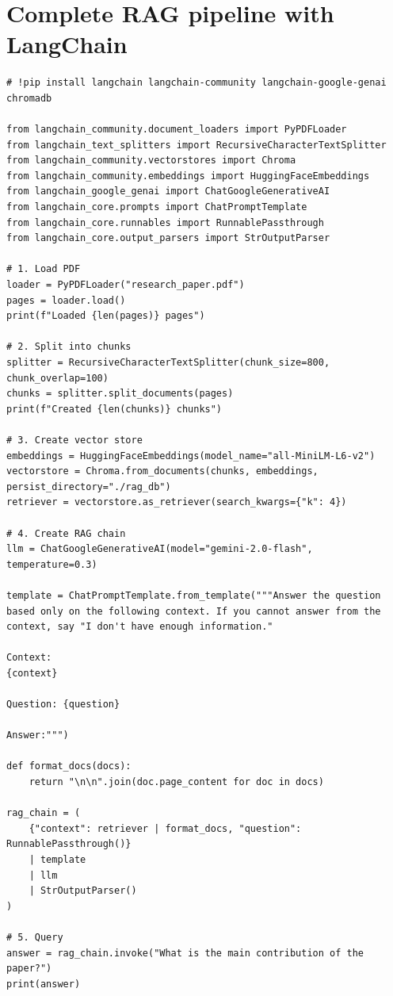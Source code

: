\section{Complete RAG pipeline with LangChain}

\begin{verbatim}
# !pip install langchain langchain-community langchain-google-genai chromadb

from langchain_community.document_loaders import PyPDFLoader
from langchain_text_splitters import RecursiveCharacterTextSplitter
from langchain_community.vectorstores import Chroma
from langchain_community.embeddings import HuggingFaceEmbeddings
from langchain_google_genai import ChatGoogleGenerativeAI
from langchain_core.prompts import ChatPromptTemplate
from langchain_core.runnables import RunnablePassthrough
from langchain_core.output_parsers import StrOutputParser

# 1. Load PDF
loader = PyPDFLoader("research_paper.pdf")
pages = loader.load()
print(f"Loaded {len(pages)} pages")

# 2. Split into chunks
splitter = RecursiveCharacterTextSplitter(chunk_size=800, chunk_overlap=100)
chunks = splitter.split_documents(pages)
print(f"Created {len(chunks)} chunks")

# 3. Create vector store
embeddings = HuggingFaceEmbeddings(model_name="all-MiniLM-L6-v2")
vectorstore = Chroma.from_documents(chunks, embeddings, persist_directory="./rag_db")
retriever = vectorstore.as_retriever(search_kwargs={"k": 4})

# 4. Create RAG chain
llm = ChatGoogleGenerativeAI(model="gemini-2.0-flash", temperature=0.3)

template = ChatPromptTemplate.from_template("""Answer the question based only on the following context. If you cannot answer from the context, say "I don't have enough information."

Context:
{context}

Question: {question}

Answer:""")

def format_docs(docs):
    return "\n\n".join(doc.page_content for doc in docs)

rag_chain = (
    {"context": retriever | format_docs, "question": RunnablePassthrough()}
    | template
    | llm
    | StrOutputParser()
)

# 5. Query
answer = rag_chain.invoke("What is the main contribution of the paper?")
print(answer)
\end{verbatim}

